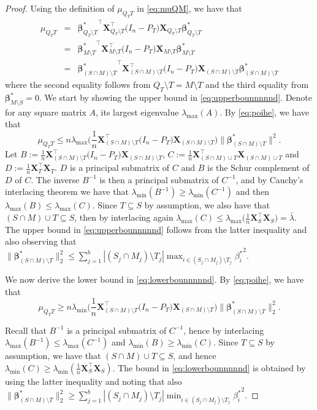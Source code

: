 \documentclass[bj,authoryear]{imsart}
\theoremstyle{plain}
\newcommand{\bs}{\boldsymbol}
\begin{document}
\begin{proof}
Using the definition of $\mu_{Q_T T}$ in \eqref{eq:muQM}, we have that 
\begin{eqnarray}
    \mu_{Q_TT}&=&{\bs \beta^*_{Q_T\setminus T}}^{\top}\bs X_{Q_T\setminus T}^{\top}  \big(I_n-P_T\big) \bs X_{Q_T\setminus T} \bs \beta^*_{Q_T\setminus T}\nonumber\\
    &=&{\bs \beta^*_{M\setminus T}}^{\top}\bs X_{M\setminus T}^{\top}  \big(I_n-P_T\big) \bs X_{M\setminus T} \bs \beta^*_{M\setminus T}\nonumber\\
    &=&{\bs \beta^*_{(S\cap M)\setminus T}}^{\top}\bs X_{(S\cap M)\setminus T}^{\top}  \big(I_n-P_T\big) \bs X_{(S\cap M)\setminus T} \bs \beta^*_{(S\cap M)\setminus T}\label{eq:poihe}
\end{eqnarray}
where the second equality follows from $Q_T\setminus T =M\setminus T $ and the third equality from $\bs \beta^*_{M\setminus S}=0$.
We start by showing the upper bound in \eqref{eq:upperbounnnnnd}. Denote for any square matrix $A$, its largest eigenvalue 
$\lambda_{\max}(A)$. By \eqref{eq:poihe}, we have that
$$\mu_{Q_TT}\leq n\lambda_{\max}\Big(\frac{1}{n}\bs X_{(S\cap M)\setminus T}^{\top}  \big(I_n-P_T\big) \bs X_{(S\cap M)\setminus T}\Big) \|\bs \beta^*_{(S\cap M)\setminus T}\|^2.$$
Let $B:=\tfrac{1}{n}\bs X_{(S\cap M)\setminus T}^{\top}  \big(I_n-P_T\big) \bs X_{(S\cap M)\setminus T}$, $C:=\tfrac{1}{n}\bs X_{(S\cap M)\cup T}^{\top}\bs X_{(S\cap M)\cup T}$ and $D:=\tfrac{1}{n}\bs X_T^{\top} \bs X_T$. $D$ is a principal submatrix of $C$ and $B$ is the Schur complement of $D$ of $C$. The inverse $B^{-1}$ is then a principal submatrix of $C^{-1}$, and by Cauchy's interlacing theorem we have that   $\lambda_{\min}(B^{-1})\geq \lambda_{\min}(C^{-1})$ and then $\lambda_{\max}(B)\leq \lambda_{\max}(C)$. Since $T \subseteq S$ by assumption, we also have that $(S\cap M)\cup T \subseteq S$, then by interlacing again $\lambda_{\max}(C)\leq \lambda_{\max}\Big(\tfrac{1}{n}\bs X_S^{\top}\bs X_S\Big)=\bar{\lambda}$. The upper bound in \eqref{eq:upperbounnnnnd} follows from the latter inequality and also observing that $\|\bs \beta^*_{(S\cap M)\setminus T}\|_2^2\leq \sum_{j=1}^b |(S_j\cap M_j)\setminus T_j|\max_{i\in (S_j\cap M_j)\setminus T_j}{\beta_i^*}^2$.

We now derive the lower bound in \eqref{eq:lowerbounnnnnd}. By \eqref{eq:poihe}, we have that %
$$\mu_{Q_TT}\geq n\lambda_{\min}\Big(\frac{1}{n}\bs X_{(S\cap M)\setminus T}^{\top}  \big(I_n-P_T\big) \bs X_{(S\cap M)\setminus T}\Big) \|\bs \beta^*_{(S\cap M)\setminus T}\|_2^2.$$

Recall that $B^{-1}$ is a principal submatrix of $C^{-1}$, hence by interlacing $\lambda_{\max}(B^{-1})\leq \lambda_{\max}(C^{-1})$ and $\lambda_{\min}(B)\geq \lambda_{\min}(C)$. Since $T \subseteq S$ by assumption, we have that $(S\cap M)\cup T \subseteq S$, and hence $\lambda_{\min}(C)\geq\lambda_{\min}(\frac{1}{n}\bs X_S^{\top} \bs X_S)$.
The bound in \eqref{eq:lowerbounnnnnd} is obtained by using the latter inequality and noting that also $\|\bs \beta^*_{(S\cap M)\setminus T}\|_2^2\geq \sum_{j=1}^b |(S_j\cap M_j)\setminus T_j|\min_{i\in (S_j\cap M_j)\setminus T_j}{\beta_i^*}^2.$
\end{proof}
\end{document}
